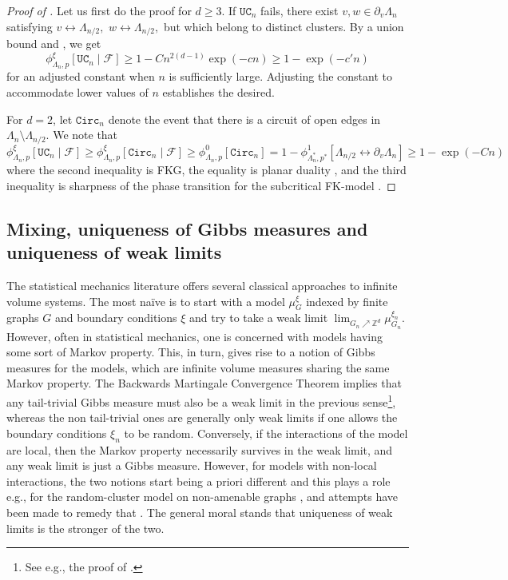 \documentclass[article,11pt,reqno]{amsart}
\newcommand{\cc}{\leftrightarrow}
\begin{document}
\begin{proof}[Proof of ]
Let us first do the proof for $d\geq 3$. If $\mathtt{UC}_n$ fails, there exist $v,w\in \partial_v\Lambda_n$ satisfying $v\cc \Lambda_{n/2},$ $w\cc\Lambda_{n/2},$ but which belong to distinct clusters. By a union bound and , we get
$$
\phi^\xi_{\Lambda_n,p}[\mathtt{UC}_n\mid \mathcal{F}]\geq 1- Cn^{2(d-1)}\exp(-cn)\geq 1-\exp(-c'n)
$$
for an adjusted constant when $n$ is sufficiently large. Adjusting the constant to accommodate lower values of $n$ establishes the desired.

For $d= 2$, let $\mathtt{Circ}_n$ denote the event that there is a circuit of open edges in $\Lambda_n\setminus \Lambda_{n/2}.$ We note that
$$
\phi^\xi_{\Lambda_n,p}[\mathtt{UC}_n\mid \mathcal{F}]\geq \phi^\xi_{\Lambda_n,p}[\mathtt{Circ}_n\mid \mathcal{F}]\geq \phi^0_{\Lambda_n,p}[\mathtt{Circ}_n] =1-\phi^1_{\Lambda_n^*,p^*}[ \Lambda_{n/2}\cc \partial_v\Lambda_{n}]\geq 1-\exp(-Cn)
$$
where the second inequality is FKG, the equality is planar duality \cite[Proposition 2.17]{DC17}, and the third inequality is sharpness of the phase transition for the subcritical FK-model \cite{DCsharpness}.
\end{proof}


\subsection{Mixing, uniqueness of Gibbs measures and uniqueness of weak limits}
The statistical mechanics literature offers several classical approaches to infinite volume systems. The most naïve is to start with a model $\mu^{\xi}_G$ indexed by finite graphs $G$ and boundary conditions $\xi$ and try to take a weak limit $\lim_{G_n\nearrow \mathbb{Z}^d}\mu^{\xi_n}_{G_n}.$ 
However, often in statistical mechanics, one is concerned with models having some sort of Markov property.  
This, in turn, gives rise to a notion of Gibbs measures for the models, which are infinite volume measures sharing the same Markov property. The Backwards Martingale Convergence Theorem implies that any tail-trivial Gibbs measure must also be a weak limit in the previous sense\footnote{See e.g., the proof of \cite[Theorem 6.63]{friedli2018}.}, whereas the non tail-trivial ones are generally only weak limits if one allows the boundary conditions $\xi_n$ to be random. Conversely, if the interactions of the model are local, then the Markov property necessarily survives in the weak limit, and any weak limit is just a Gibbs measure. However, for models with non-local interactions, the two notions start being a priori different and this plays a role e.g., for the random-cluster model on non-amenable graphs \cite{Haggstrom1996}, and attempts have been made to remedy that \cite{halberstam2023uniqueness}. The general moral stands that uniqueness of weak limits is the stronger of the two.
\end{document}
